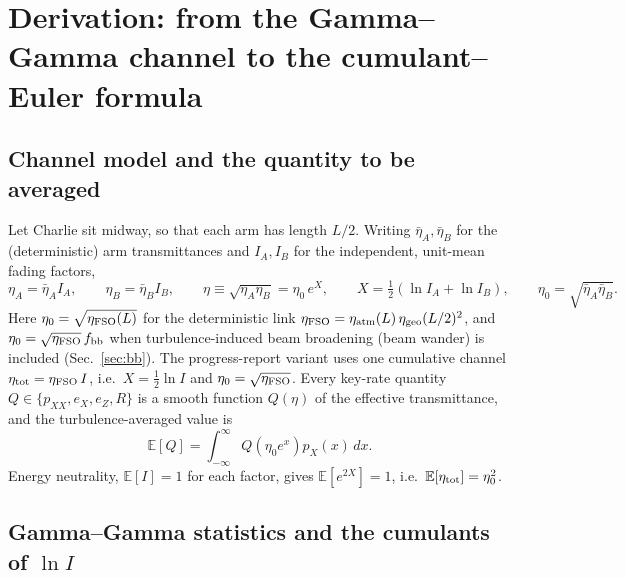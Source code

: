 \section{Derivation: from the Gamma--Gamma channel to the cumulant--Euler formula}
\label{sec:derivation}

\subsection{Channel model and the quantity to be averaged}

Let Charlie sit midway, so that each arm has length $L/2$. Writing $\bar\eta_{A},\bar\eta_{B}$ for the (deterministic) arm transmittances and $I_A,I_B$ for the independent, unit-mean fading factors,
\begin{equation}
  \eta_A=\bar\eta_A I_A,\qquad \eta_B=\bar\eta_B I_B,\qquad
  \eta\equiv\sqrt{\eta_A\eta_B}=\eta_0\,e^{X},\qquad
  X=\tfrac12(\ln I_A+\ln I_B),\qquad \eta_0=\sqrt{\bar\eta_A\bar\eta_B}.
  \label{eq:model}
\end{equation}
Here $\eta_0=\sqrt{\eta_{\rm FSO}(L)}$ for the deterministic link $\eta_{\rm FSO}=\eta_{\rm atm}(L)\,\eta_{\rm geo}(L/2)^2$, and $\eta_0=\sqrt{\eta_{\rm FSO}}\,f_{\rm bb}$ when turbulence-induced beam broadening (beam wander) is included (Sec.~\ref{sec:bb}). The progress-report variant uses one cumulative channel $\eta_{\rm tot}=\eta_{\rm FSO}\,I$, i.e.\ $X=\tfrac12\ln I$ and $\eta_0=\sqrt{\eta_{\rm FSO}}$.
Every key-rate quantity $Q\in\{p_{XX},e_X,e_Z,R\}$ is a smooth function $Q(\eta)$ of the effective transmittance, and the turbulence-averaged value is
\begin{equation}
  \mathbb E[Q]=\int_{-\infty}^{\infty}Q\!\left(\eta_0e^{x}\right)p_X(x)\,dx .
  \label{eq:avg}
\end{equation}
Energy neutrality, $\mathbb E[I]=1$ for each factor, gives $\mathbb E[e^{2X}]=1$, i.e.\ $\mathbb E[\eta_{\rm tot}]=\eta_0^2$.

\subsection{Gamma--Gamma statistics and the cumulants of $\ln I$}
\label{sec:ggstats}

